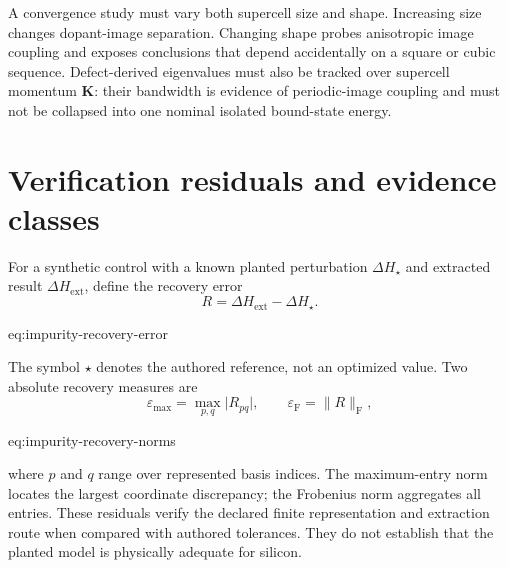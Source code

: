 A convergence study must vary both supercell size and shape. Increasing size
changes dopant-image separation. Changing shape probes anisotropic image
coupling and exposes conclusions that depend accidentally on a square or cubic
sequence. Defect-derived eigenvalues must also be tracked over supercell
momentum $\mathbf K$: their bandwidth is evidence of periodic-image coupling
and must not be collapsed into one nominal isolated bound-state energy.

\section{Verification residuals and evidence classes}

For a synthetic control with a known planted perturbation
$\Delta H_{\star}$ and extracted result $\Delta H_{\mathrm{ext}}$, define the
recovery error
\begin{equation}
    R=\Delta H_{\mathrm{ext}}-\Delta H_{\star}.
    \label{eq:impurity-recovery-error}
\end{equation}
\begin{equationterms}{eq:impurity-recovery-error}
\end{equationterms}
The symbol $\star$ denotes the authored reference, not an optimized value. Two
absolute recovery measures are
\begin{equation}
    \varepsilon_{\max}=\max_{p,q}\lvert R_{pq}\rvert,
    \qquad
    \varepsilon_{\mathrm F}=\lVert R\rVert_{\mathrm F},
    \label{eq:impurity-recovery-norms}
\end{equation}
\begin{equationterms}{eq:impurity-recovery-norms}
\end{equationterms}
where $p$ and $q$ range over represented basis indices. The maximum-entry norm
locates the largest coordinate discrepancy; the Frobenius norm aggregates all
entries. These residuals verify the declared finite representation and
extraction route when compared with authored tolerances. They do not establish
that the planted model is physically adequate for silicon.

